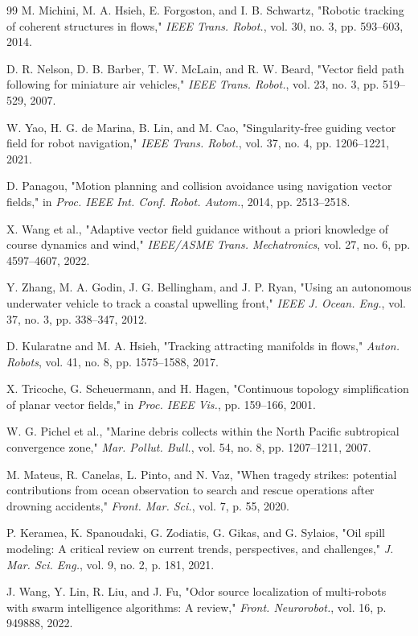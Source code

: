 \documentclass[lettersize,journal]{IEEEtran}
\begin{document}
\begin{thebibliography}{99}
 M. Michini, M. A. Hsieh, E. Forgoston, and I. B. Schwartz, "Robotic tracking of coherent structures in flows," \textit{IEEE Trans. Robot.}, vol. 30, no. 3, pp. 593--603, 2014.

 D. R. Nelson, D. B. Barber, T. W. McLain, and R. W. Beard, "Vector field path following for miniature air vehicles," \textit{IEEE Trans. Robot.}, vol. 23, no. 3, pp. 519--529, 2007.

 W. Yao, H. G. de Marina, B. Lin, and M. Cao, "Singularity-free guiding vector field for robot navigation," \textit{IEEE Trans. Robot.}, vol. 37, no. 4, pp. 1206--1221, 2021.

 D. Panagou, "Motion planning and collision avoidance using navigation vector fields," in \textit{Proc. IEEE Int. Conf. Robot. Autom.}, 2014, pp. 2513--2518.

 X. Wang et al., "Adaptive vector field guidance without a priori knowledge of course dynamics and wind," \textit{IEEE/ASME Trans. Mechatronics}, vol. 27, no. 6, pp. 4597--4607, 2022.

 Y. Zhang, M. A. Godin, J. G. Bellingham, and J. P. Ryan, "Using an autonomous underwater vehicle to track a coastal upwelling front," \textit{IEEE J. Ocean. Eng.}, vol. 37, no. 3, pp. 338--347, 2012.

 D. Kularatne and M. A. Hsieh, "Tracking attracting manifolds in flows," \textit{Auton. Robots}, vol. 41, no. 8, pp. 1575--1588, 2017.

 X. Tricoche, G. Scheuermann, and H. Hagen, "Continuous topology simplification of planar vector fields," in \textit{Proc. IEEE Vis.}, pp. 159--166, 2001.

 W. G. Pichel et al., "Marine debris collects within the North Pacific subtropical convergence zone," \textit{Mar. Pollut. Bull.}, vol. 54, no. 8, pp. 1207--1211, 2007.

 M. Mateus, R. Canelas, L. Pinto, and N. Vaz, "When tragedy strikes: potential contributions from ocean observation to search and rescue operations after drowning accidents," \textit{Front. Mar. Sci.}, vol. 7, p. 55, 2020.

 P. Keramea, K. Spanoudaki, G. Zodiatis, G. Gikas, and G. Sylaios, "Oil spill modeling: A critical review on current trends, perspectives, and challenges," \textit{J. Mar. Sci. Eng.}, vol. 9, no. 2, p. 181, 2021.

 J. Wang, Y. Lin, R. Liu, and J. Fu, "Odor source localization of multi-robots with swarm intelligence algorithms: A review," \textit{Front. Neurorobot.}, vol. 16, p. 949888, 2022.


\end{thebibliography}
\end{document}
